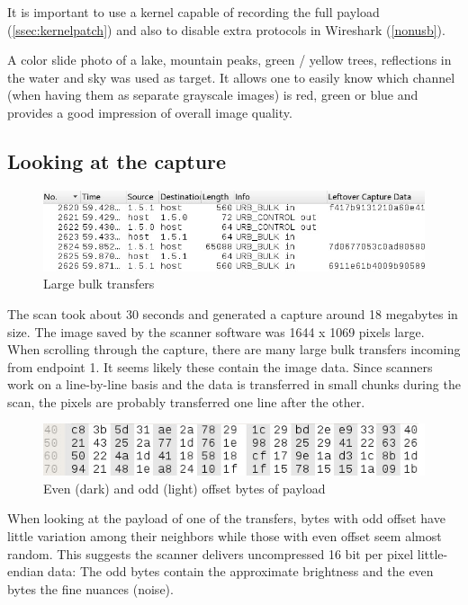 \documentclass{article}
\begin{document}
It is important to use a kernel capable of recording the full payload (\autoref{ssec:kernelpatch})
and also to disable extra protocols in Wireshark (\autoref{nonusb}).

A color slide photo of a lake, mountain peaks, green / yellow trees,
reflections in the water and sky was used as target.
It allows one to easily know which channel (when having them as separate grayscale images)
is red, green or blue and provides a good impression of overall image quality.

\subsection{Looking at the capture}

\begin{figure}[H]
  \caption{Large bulk transfers}
  \centering
  \includegraphics[width=\textwidth]{images/extract_sniff1.jpg}
\end{figure}

The scan took about 30 seconds and generated a capture around 18 megabytes
in size. The image saved by the scanner software was 1644 x 1069 pixels large.
When scrolling through the capture, there are many large bulk transfers
incoming from endpoint 1. It seems likely these contain the image data.
Since scanners work on a line-by-line basis and the data is transferred
in small chunks during the scan, the pixels are probably transferred
one line after the other.

\begin{figure}[H]
  \caption{Even (dark) and odd (light) offset bytes of payload}
  \centering
  \includegraphics[width=\textwidth]{images/extract_sniff2.jpg}
\end{figure}

\label{capture_highlowbytes}

When looking at the payload of one of the transfers, bytes with odd offset
have little variation among their neighbors while those with even offset
seem almost random. This suggests the scanner delivers uncompressed
16 bit per pixel little-endian data:
The odd bytes contain the approximate brightness and
the even bytes the fine nuances (noise).
\end{document}
